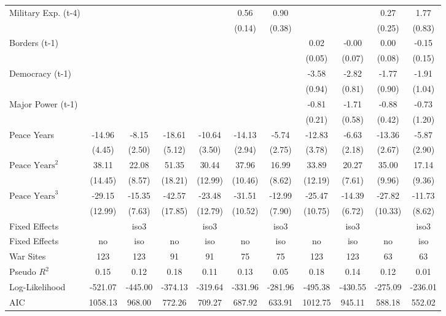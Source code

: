 \begin{tabular}{lcccccccccc}
Military Exp. (t-4) &  &  &  &  & 0.56 & 0.90 &  &  & 0.27 & 1.77 \\
&  &  &  &  & (0.14) & (0.38) &  &  & (0.25) & (0.83) \\
Borders (t-1) &  &  &  &  &  &  & 0.02 & -0.00 & 0.00 & -0.15 \\
&  &  &  &  &  &  & (0.05) & (0.07) & (0.08) & (0.15) \\
Democracy (t-1) &  &  &  &  &  &  & -3.58 & -2.82 & -1.77 & -1.91 \\
&  &  &  &  &  &  & (0.94) & (0.81) & (0.90) & (1.04) \\
Major Power (t-1) &  &  &  &  &  &  & -0.81 & -1.71 & -0.88 & -0.73 \\
&  &  &  &  &  &  & (0.21) & (0.58) & (0.42) & (1.20) \\
Peace Years & -14.96 & -8.15 & -18.61 & -10.64 & -14.13 & -5.74 & -12.83 & -6.63 & -13.36 & -5.87 \\
& (4.45) & (2.50) & (5.12) & (3.50) & (2.94) & (2.75) & (3.78) & (2.18) & (2.67) & (2.90) \\
$\text{Peace Years}^2$ & 38.11 & 22.08 & 51.35 & 30.44 & 37.96 & 16.99 & 33.89 & 20.27 & 35.00 & 17.14 \\
& (14.45) & (8.57) & (18.21) & (12.99) & (10.46) & (8.62) & (12.19) & (7.61) & (9.96) & (9.36) \\
$\text{Peace Years}^3$ & -29.15 & -15.35 & -42.57 & -23.48 & -31.51 & -12.99 & -25.47 & -14.39 & -27.82 & -11.73 \\
& (12.99) & (7.63) & (17.85) & (12.79) & (10.52) & (7.90) & (10.75) & (6.72) & (10.33) & (8.62) \\
Fixed Effects &  & iso3 &  & iso3 &  & iso3 &  & iso3 &  & iso3 \\
\midrule
Fixed Effects & no & iso & no & iso & no & iso & no & iso & no & iso \\
War Sites & 123 & 123 & 91 & 91 & 75 & 75 & 123 & 123 & 63 & 63 \\
Pseudo $R^2$ & 0.15 & 0.12 & 0.18 & 0.11 & 0.13 & 0.05 & 0.18 & 0.14 & 0.12 & 0.01 \\
Log-Likelihood & -521.07 & -445.00 & -374.13 & -319.64 & -331.96 & -281.96 & -495.38 & -430.55 & -275.09 & -236.01 \\
AIC & 1058.13 & 968.00 & 772.26 & 709.27 & 687.92 & 633.91 & 1012.75 & 945.11 & 588.18 & 552.02 \\
\bottomrule
\end{tabular}
